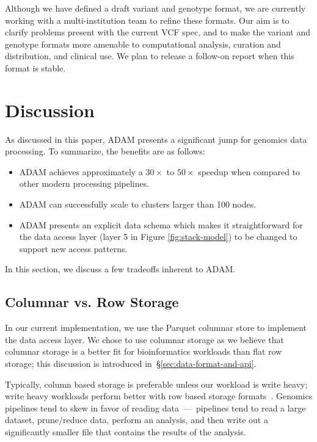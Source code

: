 \documentclass[10pt,twocolumn]{article}
\theoremstyle{plain}
\begin{document}
Although we have defined a draft variant and genotype format, we are currently working with a multi-institution team to
refine these formats. Our aim is to clarify problems present with the current VCF spec, and to make the variant and genotype
formats more amenable to computational analysis, curation and distribution, and clinical use. We plan to release a follow-on
report when this format is stable.

\section{Discussion}
\label{sec:discussion}

As discussed in this paper, ADAM presents a significant jump for genomics data processing. To summarize, the benefits are as
follows:

\begin{itemize}
\item ADAM achieves approximately a $30\times$ to $50\times$ speedup when compared to other modern processing pipelines.
\item ADAM can successfully scale to clusters larger than 100 nodes.
\item ADAM presents an explicit data schema which makes it straightforward for the data access layer (layer 5 in Figure \ref{fig:stack-model}) to be changed
to support new access patterns.
\end{itemize}

In this section, we discuss a few tradeoffs inherent to ADAM.

\subsection{Columnar vs. Row Storage}
\label{sec:columnar-vs-row-storage}

In our current implementation, we use the Parquet columnar store to implement the data access layer. We chose to use
columnar storage as we believe that columnar storage is a better fit for bioinformatics workloads than flat row storage;
this discussion is introduced in~\S\ref{sec:data-format-and-api}. 

Typically, column based storage is preferable unless
our workload is write heavy; write heavy workloads perform better with row based storage formats~\cite{stonebraker05}.
Genomics pipelines tend to skew in favor of reading data~---~pipelines tend to read a large dataset, prune/reduce data,
perform an analysis, and then write out a significantly smaller file that contains the results of the analysis.
\end{document}

